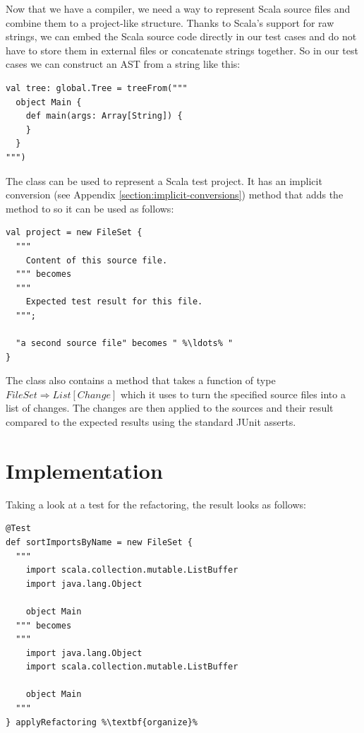 \documentclass[10pt,a4paper,oneside]{scrreprt}
\begin{document}
Now that we have a compiler, we need a way to represent Scala source files and combine them to a project-like structure. Thanks to Scala's support for raw strings, we can embed the Scala source code directly in our test cases and do not have to store them in external files or concatenate strings together. So in our test cases we can construct an AST from a string like this:

\begin{lstlisting}
val tree: global.Tree = treeFrom("""
  object Main {
    def main(args: Array[String]) {
    }
  }
""")
\end{lstlisting}

The  class can be used to represent a Scala test project. It has an implicit conversion (see Appendix \vref{section:implicit-conversions}) method that adds the  method to  so it can be used as follows:

\begin{lstlisting}
val project = new FileSet {
  """
    Content of this source file.
  """ becomes
  """
    Expected test result for this file.
  """;

  "a second source file" becomes " %\ldots% "
}
\end{lstlisting}

The  class also contains a method  that takes a function of type $FileSet \Rightarrow List[Change]$ which it uses to turn the specified source files into a list of changes. The changes are then applied to the sources and their result compared to the expected results using the standard JUnit asserts.

\section{Implementation}

Taking a look at a test for the  refactoring, the result looks as follows:

\begin{lstlisting}
@Test
def sortImportsByName = new FileSet {
  """
    import scala.collection.mutable.ListBuffer
    import java.lang.Object

    object Main
  """ becomes
  """
    import java.lang.Object
    import scala.collection.mutable.ListBuffer

    object Main
  """
} applyRefactoring %\textbf{organize}%
\end{lstlisting}
\end{document}
